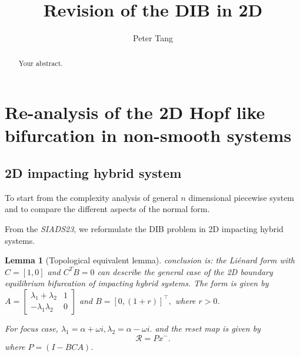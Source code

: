 \documentclass{article}
\title{Revision of the DIB in 2D }
\author{Peter Tang}
\newtheorem{lemma}[theorem]{Lemma}
\begin{document}
\maketitle

\begin{abstract}
Your abstract.
\end{abstract}


\section{Re-analysis of the 2D Hopf like bifurcation in non-smooth systems}
\subsection{2D impacting hybrid system}
\label{sec:2D_IHS}

To start from the complexity analysis of general $n$ dimensional piecewise system and to compare the different aspects of the normal form.

From the \emph{SIADS23}, we reformulate the DIB  problem in 2D impacting hybrid systems.

\begin{lemma}[Topological equivalent lemma]
	conclusion is: the Li\'enard form with $C = [1,0]$ and $C^TB = 0$ can describe the general case of the 2D boundary equilibrium bifurcation of impacting hybrid systems.
	The form is given by
	$
	A = \begin{bmatrix}
		\lambda_1 + \lambda_2 & 1 \\
		-\lambda_1 \lambda_2 & 0
		\end{bmatrix}
	$
	and 
	$
	B = [0, (1+r)]^{\top},
	$
where $r>0$.

For focus case,
$
\lambda_1 = \alpha + \omega i, \lambda_2 = \alpha - \omega i.
$
and the reset map is given by 
$$
\mathcal{R} =Px^-.
$$
where 
$ P= (I - BCA)$.

\label{lemma:2D canonical form lemma}
\end{lemma}
\end{document}
